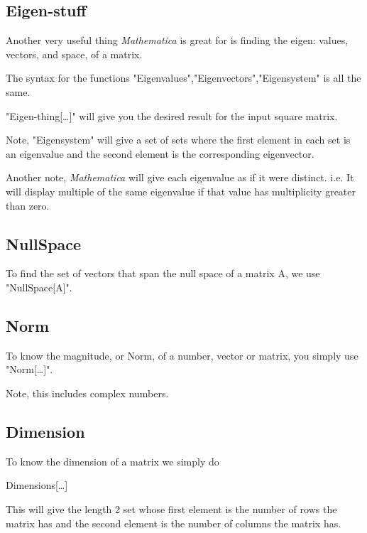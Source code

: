 \documentclass[11pt,a4paper,twoside]{article}
\begin{document}
			\subsection{Eigen-stuff}
					
				Another very useful thing \textit{Mathematica} is great for is finding the eigen: values, vectors, and space, of a matrix.
						
				The syntax for the functions "Eigenvalues","Eigenvectors","Eigensystem" is all the same.
						
				"Eigen-thing[\dots]" will give you the desired result for the input square matrix.
						
				Note, "Eigensystem" will give a set of sets where the first element in each set is an eigenvalue and the second element is the corresponding eigenvector.
						
				Another note, \textit{Mathematica} will give each eigenvalue as if it were distinct.  i.e. It will display multiple of the same eigenvalue if that value has multiplicity greater than zero.
						
			\subsection{NullSpace}
						
				To find the set of vectors that span the null space of a matrix A, we use "NullSpace[A]".
						
			\subsection{Norm}
						
				To know the magnitude, or Norm, of a number, vector or matrix, you simply use "Norm[\dots]".
						
				Note, this includes complex numbers.
						
			\subsection{Dimension}
						
				To know the dimension of a matrix we simply do 
						
				\begin{center} Dimensions[\dots] \end{center}
						
				This will give the length 2 set whose first element is the number of rows the matrix has and the second element is the number of columns the matrix has.
						
\end{document}
